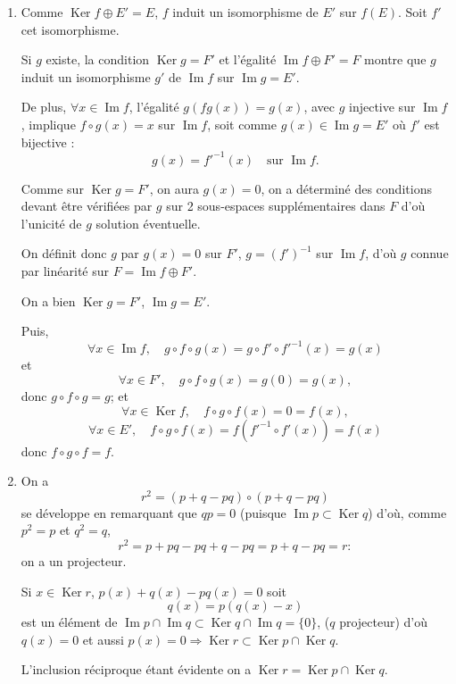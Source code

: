 \begin{enumerate}[label=\arabic*.,leftmargin=2.2em,itemsep=1.1em]

\item Comme $\operatorname{Ker} f\oplus E'=E$, $f$ induit un isomorphisme de $E'$ sur $f(E)$. Soit $f'$ cet isomorphisme.

Si $g$ existe, la condition $\operatorname{Ker} g=F'$ et l'égalité $\operatorname{Im}f\oplus F'=F$ montre que $g$ induit un isomorphisme $g'$ de $\operatorname{Im}f$ sur $\operatorname{Im}g=E'$.

De plus, $\forall x\in\operatorname{Im}f$, l'égalité $g(fg(x))=g(x)$, avec $g$ injective sur $\operatorname{Im}f$, implique $f\circ g(x)=x$ sur $\operatorname{Im}f$, soit comme $g(x)\in\operatorname{Im}g=E'$ où $f'$ est bijective :
\[
g(x)=f'^{-1}(x)\quad\text{sur }\operatorname{Im}f.
\]

Comme sur $\operatorname{Ker} g=F'$, on aura $g(x)=0$, on a déterminé des conditions devant être vérifiées par $g$ sur 2 sous-espaces supplémentaires dans $F$ d'où l'unicité de $g$ solution éventuelle.

On définit donc $g$ par $g(x)=0$ sur $F'$, $g=(f')^{-1}$ sur $\operatorname{Im}f$, d'où $g$ connue par linéarité sur $F=\operatorname{Im}f\oplus F'$.

On a bien $\operatorname{Ker} g=F'$, $\operatorname{Im}g=E'$.

Puis,
\[
\forall x\in\operatorname{Im}f,\quad g\circ f\circ g(x)=g\circ f'\circ f'^{-1}(x)=g(x)
\]
et
\[
\forall x\in F',\quad g\circ f\circ g(x)=g(0)=g(x),
\]
donc $g\circ f\circ g=g$; et
\[
\forall x\in\operatorname{Ker} f,\quad f\circ g\circ f(x)=0=f(x),
\]
\[
\forall x\in E',\quad f\circ g\circ f(x)=f(f'^{-1}\circ f'(x))=f(x)
\]
donc $f\circ g\circ f=f$.

\item On a
\[
r^2=(p+q-pq)\circ(p+q-pq)
\]
se développe en remarquant que $qp=0$ (puisque $\operatorname{Im}p\subset\operatorname{Ker} q$) d'où, comme $p^2=p$ et $q^2=q$,
\[
r^2=p+pq-pq+q-pq=p+q-pq=r:
\]
on a un projecteur.

Si $x\in\operatorname{Ker} r$, $p(x)+q(x)-pq(x)=0$ soit
\[
q(x)=p(q(x)-x)
\]
est un élément de $\operatorname{Im}p\cap\operatorname{Im}q\subset\operatorname{Ker} q\cap\operatorname{Im}q=\{0\}$, ($q$ projecteur) d'où $q(x)=0$ et aussi $p(x)=0\Rightarrow\operatorname{Ker} r\subset\operatorname{Ker} p\cap\operatorname{Ker} q$.

L'inclusion réciproque étant évidente on a $\operatorname{Ker} r=\operatorname{Ker} p\cap\operatorname{Ker} q$.


\end{enumerate}
